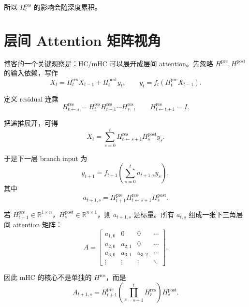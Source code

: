 \documentclass[UTF8,11pt]{ctexart}
\newcommand{\R}{\mathbb{R}}
\newcommand{\Hres}{H^{\mathrm{res}}}
\newcommand{\Hpre}{H^{\mathrm{pre}}}
\newcommand{\Hpost}{H^{\mathrm{post}}}
\begin{document}
所以 $\Hres_l$ 的影响会随深度累积。

\section{层间 Attention 矩阵视角}

博客的一个关键观察是：HC/mHC 可以展开成层间 attention。先忽略 $\Hpre,\Hpost$ 的输入依赖，写作
\begin{equation}
  X_t=
  H_t^{\mathrm{res}}X_{t-1}
  +
  H_t^{\mathrm{post}}y_t,
  \qquad
  y_t=
  f_t(H_t^{\mathrm{pre}}X_{t-1}).
\end{equation}

定义 residual 连乘
\begin{equation}
  H_{t\leftarrow s}^{\mathrm{res}}
  =
  H_t^{\mathrm{res}}H_{t-1}^{\mathrm{res}}\cdots H_s^{\mathrm{res}},
  \qquad
  H_{t\leftarrow t+1}^{\mathrm{res}}=I.
\end{equation}

把递推展开，可得
\begin{equation}
  X_t=
  \sum_{s=0}^{t}
  H_{t\leftarrow s+1}^{\mathrm{res}}
  H_s^{\mathrm{post}}y_s.
\end{equation}

于是下一层 branch input 为
\begin{equation}
  y_{t+1}
  =
  f_{t+1}\left(
  \sum_{s=0}^{t}
  a_{t+1,s}y_s
  \right),
\end{equation}
其中
\begin{equation}
  a_{t+1,s}
  =
  H_{t+1}^{\mathrm{pre}}
  H_{t\leftarrow s+1}^{\mathrm{res}}
  H_s^{\mathrm{post}}.
\end{equation}

若 $H_{t+1}^{\mathrm{pre}}\in\R^{1\times n}$，$H_s^{\mathrm{post}}\in\R^{n\times 1}$，则 $a_{t+1,s}$ 是标量。所有 $a_{t,s}$ 组成一张下三角层间 attention 矩阵：
\begin{equation}
  A=
  \begin{bmatrix}
  a_{1,0} & 0 & 0 & \cdots \\
  a_{2,0} & a_{2,1} & 0 & \cdots \\
  a_{3,0} & a_{3,1} & a_{3,2} & \cdots \\
  \vdots & \vdots & \vdots & \ddots
  \end{bmatrix}.
\end{equation}

因此 mHC 的核心不是单独的 $\Hres$，而是
\begin{equation}
  A_{t+1,s}
  =
  H_{t+1}^{\mathrm{pre}}
  \left(\prod_{r=s+1}^{t}H_r^{\mathrm{res}}\right)
  H_s^{\mathrm{post}}.
\end{equation}
\end{document}
